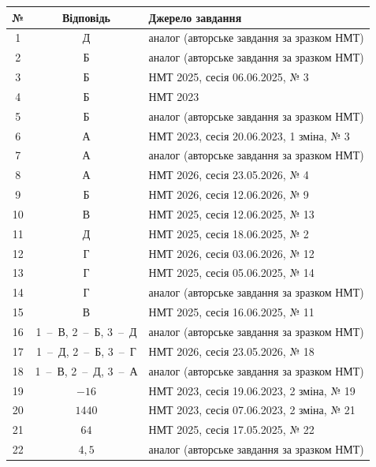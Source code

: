 \documentclass[12pt]{article}
\begin{document}
\begin{center}\small\renewcommand{\arraystretch}{1.25}
\begin{tabular}{|c|c|p{}|}\hline
\textbf{№} & \textbf{Відповідь} & \textbf{Джерело завдання} \\ \hline
1 & Д & аналог (авторське завдання за зразком НМТ) \\ \hline
2 & Б & аналог (авторське завдання за зразком НМТ) \\ \hline
3 & Б & НМТ 2025, сесія 06.06.2025, № 3 \\ \hline
4 & Б & НМТ 2023 \\ \hline
5 & Б & аналог (авторське завдання за зразком НМТ) \\ \hline
6 & А & НМТ 2023, сесія 20.06.2023, 1 зміна, № 3 \\ \hline
7 & А & аналог (авторське завдання за зразком НМТ) \\ \hline
8 & А & НМТ 2026, сесія 23.05.2026, № 4 \\ \hline
9 & Б & НМТ 2026, сесія 12.06.2026, № 9 \\ \hline
10 & В & НМТ 2025, сесія 12.06.2025, № 13 \\ \hline
11 & Д & НМТ 2025, сесія 18.06.2025, № 2 \\ \hline
12 & Г & НМТ 2026, сесія 03.06.2026, № 12 \\ \hline
13 & Г & НМТ 2025, сесія 05.06.2025, № 14 \\ \hline
14 & Г & аналог (авторське завдання за зразком НМТ) \\ \hline
15 & В & НМТ 2025, сесія 16.06.2025, № 11 \\ \hline
16 & 1~--~В, 2~--~Б, 3~--~Д & аналог (авторське завдання за зразком НМТ) \\ \hline
17 & 1~--~Д, 2~--~Б, 3~--~Г & НМТ 2026, сесія 23.05.2026, № 18 \\ \hline
18 & 1~--~В, 2~--~Д, 3~--~А & аналог (авторське завдання за зразком НМТ) \\ \hline
19 & $-16$ & НМТ 2023, сесія 19.06.2023, 2 зміна, № 19 \\ \hline
20 & $1440$ & НМТ 2023, сесія 07.06.2023, 2 зміна, № 21 \\ \hline
21 & $64$ & НМТ 2025, сесія 17.05.2025, № 22 \\ \hline
22 & $4{,}5$ & аналог (авторське завдання за зразком НМТ) \\ \hline
\end{tabular}\end{center}

\end{document}
